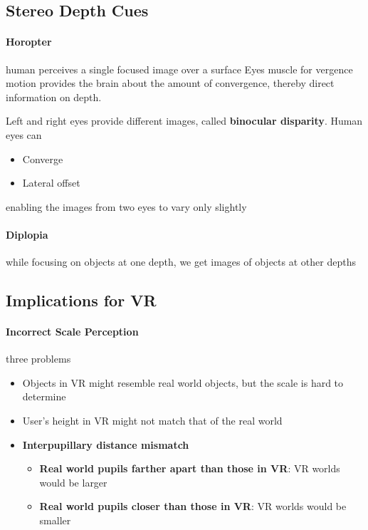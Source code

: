 \subsection{Stereo Depth Cues}

  \paragraph{Horopter} human perceives a single focused image over a surface
  Eyes muscle for vergence motion provides the brain about the amount of
  convergence, thereby direct information on depth.

  Left and right eyes provide different images, called
  \textbf{binocular disparity}. Human eyes can

  \begin{itemize}
    \item Converge
    \item Lateral offset
  \end{itemize}

  enabling the images from two eyes to vary only slightly

  \paragraph{Diplopia} while focusing on objects at one depth, we get images
  of objects at other depths

\subsection{Implications for VR}

  \paragraph{Incorrect Scale Perception} three problems
  \begin{itemize}
    \item Objects in VR might resemble real world objects, but the scale is
    hard to determine
    \item User's height in VR might not match that of the real world
    \item \textbf{Interpupillary distance mismatch}
    \begin{itemize}
      \item \textbf{Real world pupils farther apart than those in VR}: VR
      worlds would be larger
      \item \textbf{Real world pupils closer than those in VR}: VR worlds would
      be smaller
    \end{itemize}
  \end{itemize}

